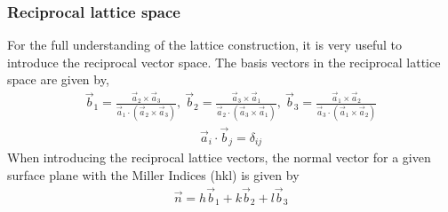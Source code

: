 \documentclass[11pt]{article} %
\begin{document}
\subsubsection{Reciprocal lattice space}
For the full understanding of the lattice construction, it is very useful to introduce the reciprocal vector space. The basis vectors in the reciprocal lattice space are given by,
\begin{eqnarray}
\vec{b}_1 = \frac{\vec{a}_2 \times \vec{a}_3}{\vec{a}_1 \cdot (\vec{a}_2 \times \vec{a}_3)}, \ \vec{b}_2 = \frac{\vec{a}_3 \times \vec{a}_1}{\vec{a}_2 \cdot (\vec{a}_3 \times \vec{a}_1)}, \ \vec{b}_3 = \frac{\vec{a}_1 \times \vec{a}_2}{\vec{a}_3 \cdot (\vec{a}_1 \times \vec{a}_2)} 
\end{eqnarray}
\begin{eqnarray}
\vec{a}_i \cdot \vec{b}_j = \delta_{ij}  \label{orthogonality}
\end{eqnarray}
When introducing the reciprocal lattice vectors, the normal vector for a given surface plane with the Miller Indices (hkl) is given by 
\begin{eqnarray}
\vec{n} = h \vec{b}_1 + k \vec{b}_2 + l \vec{b}_3 \label{hklnormalvector}
\end{eqnarray}
\end{document}
